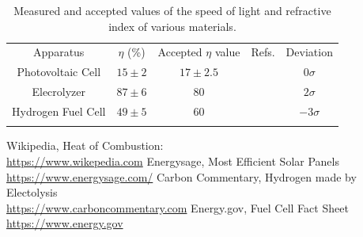 \documentclass[aps,prl,reprint]{revtex4-2}
\begin{document}
\begin{widetext}
\begin{center}
\begin{table}[h]
\renewcommand{\arraystretch}{1.35}
\setlength{\tabcolsep}{10pt}
\caption{\label{}Measured and accepted values of the speed of light and refractive index of various materials.}
\begin{tabular}{|c|c|c|c|c|}
\toprule
Apparatus &  $\eta$ (\%) & Accepted $\eta$ value & Refs. & Deviation \\
\colrule
Photovoltaic Cell &  $15 \pm 2$ & $17 \pm 2.5$ & \cite{Solar Cell} & $0\sigma$  \\
\colrule
Elecrolyzer &  $87 \pm 6$ & 80 & \cite{Electrolyzer} & $2\sigma$  \\
\colrule
Hydrogen Fuel Cell &  $49 \pm 5$ & 60 & \cite{Fuel Cell} & $-3\sigma$  \\
\botrule
\end{tabular}
\end{table}
\end{center}
\end{widetext}





\begin{thebibliography}{9}
%
Wikipedia, Heat of Combustion: \\
\href{https://en.wikipedia.org/wiki/Heat_of_combustion}{https://www.wikepedia.com}
%
Energysage, Most Efficient Solar Panels\\
\href{https://news.energysage.com/what-are-the-most-efficient-solar-panels-on-the-market/#:~:text=How%20efficient%20are%20solar%20panels,are%20not%20above%2020%25%20efficiency.}{https://www.energysage.com/}
%
Carbon Commentary, Hydrogen made by Electolysis\\
\href{https://www.carboncommentary.com/blog/2017/7/5/hydrogen-made-by-the-electrolysis-of-water-is-now-cost-competitive-and-gives-us-another-building-block-for-the-low-carbon-economy}{https://www.carboncommentary.com}
%
Energy.gov, Fuel Cell Fact Sheet\\
\href{https://www.energy.gov/sites/prod/files/2015/11/f27/fcto_fuel_cells_fact_sheet.pdf}{https://www.energy.gov}

\end{thebibliography}
\end{document}
